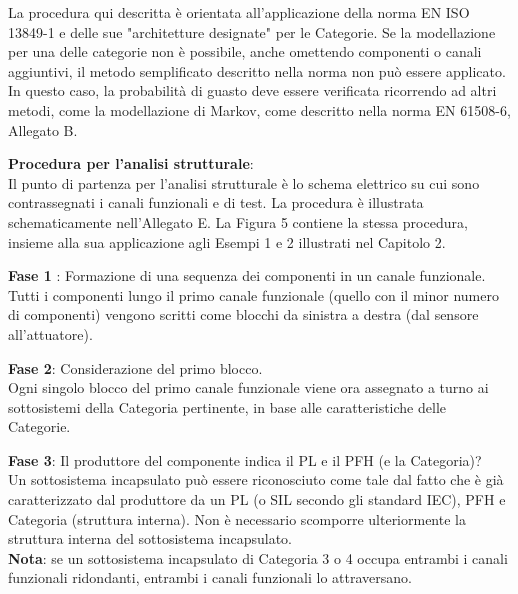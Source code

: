 \documentclass[a4paper,11pt]{article}
\begin{document}
    \par\medskip\noindent La procedura qui descritta è orientata all'applicazione della norma EN ISO 13849-1 e delle sue "architetture designate" per le Categorie. Se la modellazione per una delle categorie non è possibile, anche omettendo componenti o canali aggiuntivi, il metodo semplificato descritto nella norma non può essere applicato. In questo caso, la probabilità di guasto deve essere verificata ricorrendo ad altri metodi, come la modellazione di Markov, come descritto nella norma EN 61508-6, Allegato B.

    \par\medskip\noindent \textbf{Procedura per l'analisi strutturale}:\\
    Il punto di partenza per l'analisi strutturale è lo schema elettrico su cui sono contrassegnati i canali funzionali e di test. La procedura è illustrata schematicamente nell'Allegato E. La Figura 5 contiene la stessa procedura, insieme alla sua applicazione agli Esempi 1 e 2 illustrati nel Capitolo 2.
    
    \par\medskip\noindent\textbf{Fase 1} : Formazione di una sequenza dei componenti in un canale funzionale.\\
    Tutti i componenti lungo il primo canale funzionale (quello con il minor numero di componenti) vengono scritti come blocchi da sinistra a destra (dal sensore all'attuatore).
    
    \par\medskip\noindent \textbf{Fase 2}: Considerazione del primo blocco. \\
    Ogni singolo blocco del primo canale funzionale viene ora assegnato a turno ai sottosistemi della Categoria pertinente, in base alle caratteristiche delle Categorie.
    
    \par\medskip\noindent \textbf{Fase 3}: Il produttore del componente indica il PL e il PFH (e la Categoria)?\\
    Un sottosistema incapsulato può essere riconosciuto come tale dal fatto che è già caratterizzato dal produttore da un PL (o SIL secondo gli standard IEC), PFH e Categoria (struttura interna). Non è necessario scomporre ulteriormente la struttura interna del sottosistema incapsulato.\\
    \textbf{Nota}: se un sottosistema incapsulato di Categoria 3 o 4 occupa entrambi i canali funzionali ridondanti, entrambi i canali funzionali lo attraversano.
    
\end{document}
